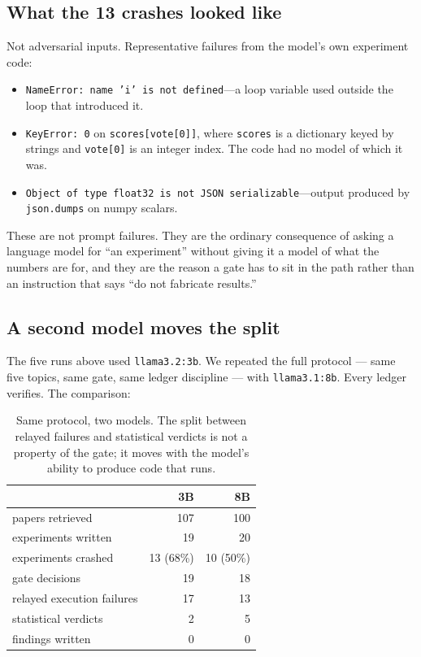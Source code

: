\documentclass[11pt]{article}
\newcommand{\code}[1]{{\small\texttt{#1}}}
\begin{document}
\subsection{What the 13 crashes looked like}

Not adversarial inputs. Representative failures from the model's own
experiment code:

\begin{itemize}
\item \code{NameError: name 'i' is not defined}---a loop variable used
outside the loop that introduced it.
\item \code{KeyError: 0} on \code{scores[vote[0]]}, where \code{scores} is a
dictionary keyed by strings and \code{vote[0]} is an integer index. The code
had no model of which it was.
\item \code{Object of type float32 is not JSON serializable}---output produced
by \code{json.dumps} on numpy scalars.
\end{itemize}

These are not prompt failures. They are the ordinary consequence of asking a
language model for ``an experiment'' without giving it a model of what the
numbers are for, and they are the reason a gate has to sit in the path rather
than an instruction that says ``do not fabricate results.''

\subsection{A second model moves the split}

The five runs above used \code{llama3.2:3b}. We repeated the full protocol ---
same five topics, same gate, same ledger discipline --- with
\code{llama3.1:8b}. Every ledger verifies. The comparison:

\begin{table}[t]
\centering\small
\begin{tabular}{lrr}
\toprule
 & 3B & 8B\\
\midrule
papers retrieved & 107 & 100\\
experiments written & 19 & 20\\
experiments crashed & 13 (68\%) & 10 (50\%)\\
\addlinespace
gate decisions & 19 & 18\\
\quad relayed execution failures & 17 & 13\\
\quad statistical verdicts & 2 & 5\\
\midrule
findings written & 0 & 0\\
\bottomrule
\end{tabular}
\caption{Same protocol, two models. The split between relayed failures and
statistical verdicts is not a property of the gate; it moves with the
model's ability to produce code that runs.}
\label{tab:models}
\end{table}
\end{document}
